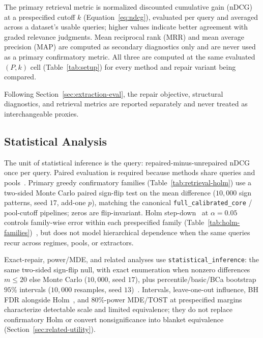 \documentclass[pdflatex,sn-basic,Numbered]{sn-jnl}
\begin{document}
The primary retrieval metric is normalized discounted cumulative gain
(nDCG) at a prespecified cutoff $k$ (Equation~\eqref{eq:ndcg}), evaluated
per query and averaged across a dataset's usable queries; higher values
indicate better agreement with graded relevance judgments. Mean
reciprocal rank (MRR) and mean average
precision (MAP) are computed as secondary diagnostics only and are never
used as a primary confirmatory metric. All three are computed at the same
evaluated $(P,k)$ cell (Table~\ref{tab:setup}) for every method and repair
variant being compared.

Following Section~\ref{sec:extraction-eval}, the repair objective,
structural diagnostics, and retrieval metrics are reported separately and
never treated as interchangeable proxies.

\subsection{Statistical Analysis}
\label{sec:statistics}

The unit of statistical inference is the query: repaired-minus-unrepaired
nDCG once per query. Paired evaluation is required because methods share
queries and pools~\cite{urbano2019statistical}. Primary greedy confirmatory
families (Table~\ref{tab:retrieval-holm}) use a two-sided Monte Carlo
paired sign-flip test on the mean difference ($10{,}000$ sign patterns,
seed $17$, add-one $p$), matching the canonical
\texttt{full\_calibrated\_core} / pool-cutoff pipelines; zeros are
flip-invariant. Holm step-down~\cite{holm1979simple} at $\alpha=0.05$
controls family-wise error within each prespecified family
(Table~\ref{tab:holm-families})~\cite{carterette2012multiple,ihemelandu2024multiple},
but does not model hierarchical dependence when the same queries recur
across regimes, pools, or extractors.

Exact-repair, power/MDE, and related analyses use
\texttt{statistical\_inference}: the same two-sided sign-flip null, with
exact enumeration when nonzero differences $m\le 20$ else Monte Carlo
($10{,}000$, seed $17$), plus percentile/basic/BCa bootstrap $95\%$
intervals ($10{,}000$ resamples, seed $13$)~\cite{efron1993introduction}.
Intervals, leave-one-out influence, BH FDR alongside
Holm~\cite{benjamini1995controlling}, and $80\%$-power MDE/TOST at
prespecified margins~\cite{lakens2018equivalence} characterize detectable
scale and limited equivalence; they do not replace confirmatory Holm or
convert nonsignificance into blanket equivalence
(Section~\ref{sec:related-utility}).
\end{document}
